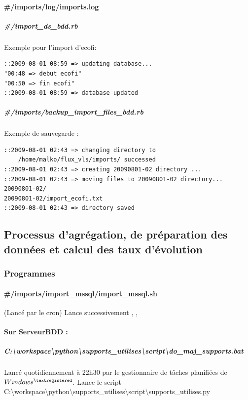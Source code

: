\paragraph{{\#}/imports/log/imports.log}
\subparagraph{{\#}/import{\_}ds{\_}bdd.rb}
Exemple pour l'import d'ecofi:
\begin{lstlisting}
::2009-08-01 08:59 => updating database...
"00:48 => debut ecofi"
"00:50 => fin ecofi"
::2009-08-01 08:59 => database updated
\end{lstlisting}
\subparagraph{{\#}/imports/backup{\_}import{\_}files{\_}bdd.rb}
Exemple de sauvegarde :
\begin{lstlisting}
::2009-08-01 02:43 => changing directory to 
	/home/malko/flux_vls/imports/ successed
::2009-08-01 02:43 => creating 20090801-02 directory ...
::2009-08-01 02:43 => moving files to 20090801-02 directory...
20090801-02/
20090801-02/import_ecofi.txt
::2009-08-01 02:43 => directory saved
\end{lstlisting}
\subsection{Processus d'agrégation, de préparation des données et calcul des taux d'évolution}
\subsubsection{Programmes}

\paragraph{{\#}/imports/import{\_}mssql/import{\_}mssql.sh} (Lancé par le cron) Lance successivement , , 

\paragraph{Sur ServeurBDD :}

\subparagraph{C:{\textbackslash}workspace{\textbackslash}python{\textbackslash}supports{\_}utilises{\textbackslash}script{\textbackslash}do{\_}maj{\_}supports.bat\\} Lancé quotidiennement à 22h30 par le gestionnaire de t\^aches planifiées de $Windows^{\textregistered}$. Lance le script C:{\textbackslash}workspace{\textbackslash}python{\textbackslash}supports{\_}utilises{\textbackslash}script{\textbackslash}supports{\_}utilises.py

